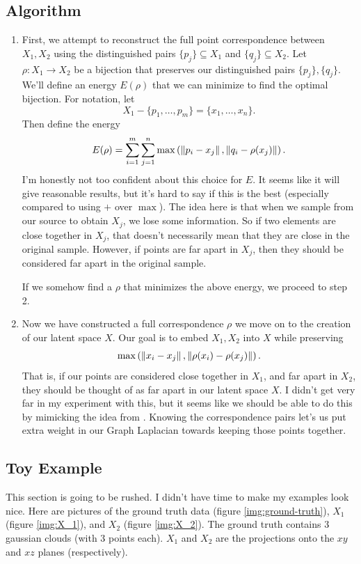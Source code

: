 \subsection*{Algorithm}
\begin{enumerate}
\item First, we attempt to reconstruct the full point correspondence between $X_1,X_2$ using the distinguished pairs
  $\{p_j\}\subseteq X_1$ and $\{q_j\}\subseteq X_2$.
Let $\rho : X_1\to X_2$ be a bijection that preserves our distinguished pairs $\{p_j\}, \{q_j\}$. We'll define an energy $E(\rho)$ that we can minimize to find the optimal bijection. For notation, let
\[X_1 - \{p_1,\ldots,p_m\} = \{x_1,\ldots,x_n\}.\]
Then define the energy
\[E(\rho) = \sum_{i=1}^m\sum_{j=1}^n \max\left( \left\lVert p_i-x_j\right\rVert, \left\lVert q_i -\rho(x_j)\right\rVert\right).\]
I'm honestly not too confident about this choice for $E$. It seems like it will give reasonable results, but it's hard to say if this is the best (especially compared to using $+$ over $\max$). The idea here is that when we sample from our source to obtain $X_j$, we lose some information. So if two elements are close together in $X_j$, that doesn't necessarily mean that they are close in the original sample. However, if points are far apart in $X_j$, then they should be considered far apart in the original sample.

If we somehow find a $\rho$ that minimizes the above energy, we proceed to step 2.

\item Now we have constructed a full correspondence $\rho$ we move on to the creation of our latent space $X$. Our goal is to embed $X_1, X_2$ into $X$ while preserving
  \[\max\left( \left\lVert x_i - x_j\right\rVert, \left\lVert\rho(x_i) - \rho(x_j)\right\rVert\right).\]
  That is, if our points are considered close together in $X_1$, and far apart in $X_2$, they should be thought of as far apart in our latent space $X$. I didn't get very far in my experiment with this, but it seems like we should be able to do this by mimicking the idea from \cite{Wang11}. Knowing the correspondence pairs let's us put extra weight in our Graph Laplacian towards keeping those points together.
\end{enumerate}

\subsection*{Toy Example}
This section is going to be rushed. I didn't have time to make my examples look nice. Here are pictures of the ground truth data (figure \ref{img:ground-truth}), $X_1$ (figure \ref{img:X_1}), and $X_2$ (figure \ref{img:X_2}). The ground truth contains 3 gaussian clouds (with 3 points each). $X_1$ and $X_2$ are the projections onto the $xy$ and $xz$ planes (respectively).

